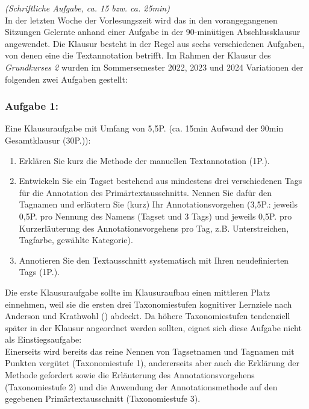\documentclass[
          a4paper,
        ]{article}
\providecommand{\tightlist}{%
  \setlength{\itemsep}{0pt}\setlength{\parskip}{0pt}}
\begin{document}
\emph{(Schriftliche Aufgabe, ca. 15 bzw. ca. 25min)}\\
In der letzten Woche der Vorlesungszeit wird das in den vorangegangenen
Sitzungen Gelernte anhand einer Aufgabe in der 90-minütigen
Abschlussklausur angewendet. Die Klausur besteht in der Regel aus sechs
verschiedenen Aufgaben, von denen eine die Textannotation betrifft. Im
Rahmen der Klausur des \emph{Grundkurses 2} wurden im Sommersemester
2022, 2023 und 2024 Variationen der folgenden zwei Aufgaben gestellt:

\subsubsection{Aufgabe 1:}\label{aufgabe-1}

Eine Klausuraufgabe mit Umfang von 5,5P. (ca. 15min Aufwand der 90min
Gesamtklausur (30P.)):

\begin{enumerate}
\def\labelenumi{\alph{enumi})}
\tightlist
\item
  Erklären Sie kurz die Methode der manuellen Textannotation (1P.).
\item
  Entwickeln Sie ein Tagset bestehend aus mindestens drei verschiedenen
  Tags für die Annotation des Primärtextausschnitts. Nennen Sie dafür
  den Tagnamen und erläutern Sie (kurz) Ihr Annotationsvorgehen (3,5P.:
  jeweils 0,5P. pro Nennung des Namens (Tagset und 3 Tags) und jeweils
  0,5P. pro Kurzerläuterung des Annotationsvorgehens pro Tag, z.B.
  Unterstreichen, Tagfarbe, gewählte Kategorie).
\item
  Annotieren Sie den Textausschnitt systematisch mit Ihren
  neudefinierten Tags (1P.).
\end{enumerate}

Die erste Klausuraufgabe sollte im Klausuraufbau einen mittleren Platz
einnehmen, weil sie die ersten drei Taxonomiestufen kognitiver Lernziele
nach Anderson und Krathwohl
() abdeckt. Da höhere
Taxonomiestufen tendenziell später in der Klausur angeordnet werden
sollten, eignet sich diese Aufgabe nicht als Einstiegsaufgabe:\\
Einerseits wird bereits das reine Nennen von Tagsetnamen und Tagnamen
mit Punkten vergütet (Taxonomiestufe 1), andererseits aber auch die
Erklärung der Methode gefordert sowie die Erläuterung des
Annotationsvorgehens (Taxonomiestufe 2) und die Anwendung der
Annotationsmethode auf den gegebenen Primärtextausschnitt
(Taxonomiestufe 3).
\end{document}
